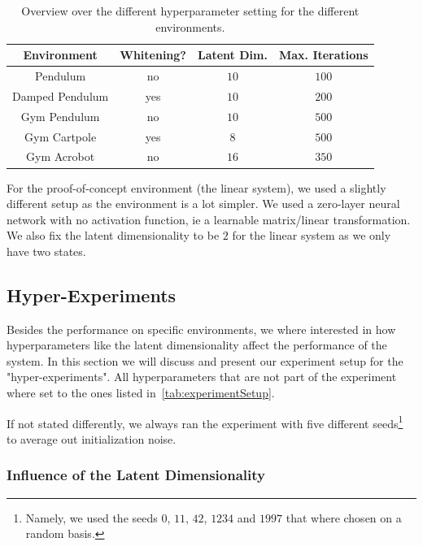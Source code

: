 		\begin{table}
			\centering
			\begin{tabular}{c|ccc}
				\textbf{Environment} & \textbf{Whitening?} & \textbf{Latent Dim.} & \textbf{Max. Iterations} \\ \hline
				      Pendulum       &         no          &        \(10\)        &         \(100\)          \\
				  Damped Pendulum    &         yes         &        \(10\)        &         \(200\)          \\
				    Gym Pendulum     &         no          &        \(10\)        &         \(500\)          \\
				    Gym Cartpole     &         yes         &        \(8\)         &         \(500\)          \\
				    Gym Acrobot      &         no          &        \(16\)        &         \(350\)
			\end{tabular}
			\caption{Overview over the different hyperparameter setting for the different environments.}
			\label{tab:experimentSetup}
		\end{table}

		For the proof-of-concept environment (the linear system), we used a slightly different setup as the environment is a lot simpler. We used a zero-layer neural network with no activation function, \ac{ie} a learnable matrix/linear transformation. We also fix the latent dimensionality to be \(2\) for the linear system as we only have two states.

	\subsection{Hyper-Experiments}
		Besides the performance on specific environments, we where interested in how hyperparameters like the latent dimensionality affect the performance of the system. In this section we will discuss and present our experiment setup for the "hyper-experiments". All hyperparameters that are not part of the experiment where set to the ones listed in~\autoref{tab:experimentSetup}.

		If not stated differently, we always ran the experiment with five different seeds\footnote{Namely, we used the seeds \(0\), \(11\), \(42\), \(1234\) and \(1997\) that where chosen on a random basis.} to average out initialization noise.

		\subsubsection{Influence of the Latent Dimensionality}
			\label{subsec:experimentLatentDim}

